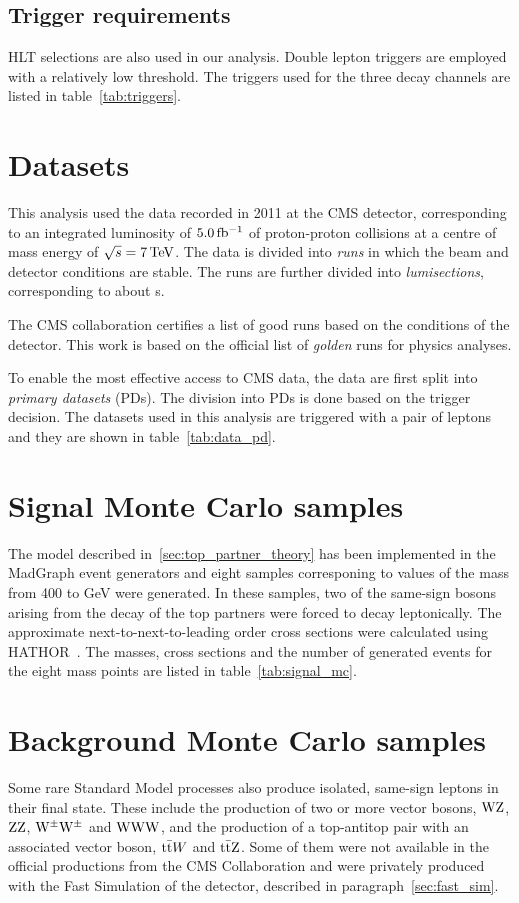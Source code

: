 \subsection{Trigger requirements}\label{sec:triggers}
HLT selections are also used in our analysis. Double lepton triggers are
employed with a relatively low \pt threshold. The triggers used for the
three decay channels are listed in table~\ref{tab:triggers}.


\section{Datasets}
This analysis used the data recorded in 2011 at the CMS detector,
corresponding to an integrated luminosity of $\unit[5.0]{fb^{-1}}$ of
proton-proton collisions at a centre of mass energy of
$\sqrt{s}=\unit[7]{TeV}$.
The data is divided into \emph{runs} in which the beam and detector
conditions are stable. The runs are further divided into
\emph{lumisections}, corresponding to about \unit[23]{s}.

The CMS collaboration certifies a list of good runs based on the conditions
of the detector. This work is based on the official list of \emph{golden}
runs for physics analyses.

To enable the most effective access to CMS data, the data are first split
into \emph{primary datasets} (PDs). The division into PDs is done based on the trigger decision.
The datasets used in this analysis are triggered with a pair of leptons and
they are shown in table~\ref{tab:data_pd}.



\section{Signal Monte Carlo samples}
The model described in~\ref{sec:top_partner_theory} has been implemented in
the MadGraph event generators and eight samples corresponing to values of
the \TP mass from 400 to \unit[750]{GeV} were generated. In these samples,
two of the same-sign \W bosons arising from the decay of the top partners
were forced to decay leptonically. The approximate next-to-next-to-leading
order cross sections were calculated using HATHOR~\cite{hathor}. The masses,
cross sections and the number of generated events for the eight mass points
are listed in table~\ref{tab:signal_mc}. 



\section{Background Monte Carlo samples}
Some rare Standard Model processes also produce isolated, same-sign leptons
in their final state. These include the production of two or more vector
bosons, $\mathrm{W}\mathrm{Z}$, $\mathrm{Z}\mathrm{Z}$, $\mathrm{W}^\pm\mathrm{W}^\pm$ and $\mathrm{W}\mathrm{W}\mathrm{W}$, and the production of
a top-antitop pair with an associated vector boson, $\mathrm{t}\bar{\mathrm{t}} W$ and
$\mathrm{t}\bar{\mathrm{t}} \mathrm{Z}$. Some of them were not available in the official productions
from the CMS Collaboration and were privately produced with the Fast
Simulation of the detector, described in paragraph~\ref{sec:fast_sim}.

